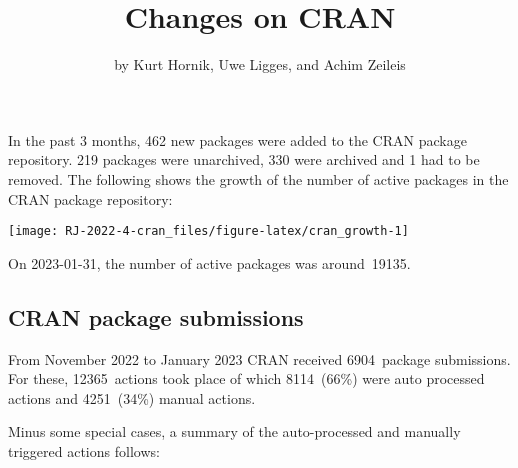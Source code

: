 \title{Changes on CRAN}
\author{by Kurt Hornik, Uwe Ligges, and Achim Zeileis}

\maketitle


In the past 3 months, 462 new packages were
added to the CRAN package repository. 219
packages were unarchived, 330 were archived and
1 had to be removed. The following shows the
growth of the number of active packages in the CRAN package repository:

\begin{center}\texttt{[image: RJ-2022-4-cran\_files/figure-latex/cran\_growth-1]} \end{center}

\noindent On 2023-01-31, the number of active packages was around~19135.

\hypertarget{cran-package-submissions}{%
\subsection{CRAN package submissions}\label{cran-package-submissions}}

From November 2022 to January 2023
CRAN received 6904~package submissions.
For these, 12365~actions took place of which
8114~(66\%) were auto processed actions and
4251~(34\%) manual actions.

Minus some special cases, a summary of the auto-processed and manually
triggered actions follows:


